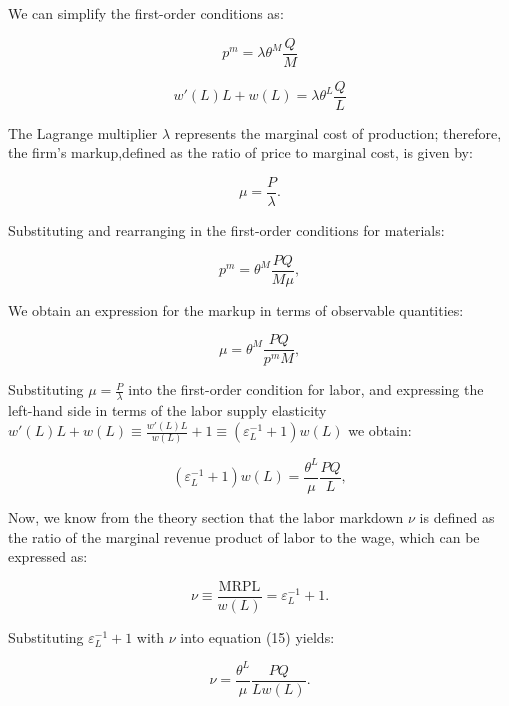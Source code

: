 \documentclass[12pt]{article}
\begin{document}
We can simplify the first-order conditions as:

\begin{equation}
p^m = \lambda \theta^M \frac{Q}{M}
\end{equation}

\begin{equation}
w'(L)L + w(L) = \lambda \theta^L  \frac{Q}{L}
\end{equation}

The Lagrange multiplier $\lambda$ represents the marginal cost of production; therefore, the firm's markup,defined as the ratio of price to marginal cost, is given by:

\begin{equation}
    \mu = \frac{P}{\lambda}.
\end{equation}

Substituting and rearranging in the first-order conditions for materials:

\begin{equation}
p^m = \theta^M \frac{PQ}{M \mu},
\end{equation}

We obtain an expression for the markup in terms of observable quantities:

\begin{equation}
\mu = \theta^M \frac{PQ}{p^m M},
\end{equation}

Substituting $\mu = \frac{P}{\lambda}$ into the first-order condition for labor, and expressing the left-hand side in terms of the labor supply elasticity $w'(L)L + w(L) \equiv \frac{w'(L)L}{w(L)} + 1 \equiv (\varepsilon_{L}^{-1} + 1) w(L)$ we obtain:

\begin{equation}
(\varepsilon_{L}^{-1} + 1) w(L)= \frac{\theta^L}{\mu} \frac{PQ}{L},
\end{equation}

Now, we know from the theory section that the labor markdown $\nu$ is defined as the ratio of the marginal revenue product of labor to the wage, which can be expressed as:

\begin{equation}
    \nu \equiv \frac{\mathrm{MRPL}}{w(L)} = 
    \varepsilon_{L}^{-1} + 1.
\end{equation}

Substituting $\varepsilon_{L}^{-1} + 1$ with $\nu$ into equation (15) yields:

\begin{equation}
\nu = \frac{\theta^L}{\mu} \frac{PQ}{L w(L)}.
\end{equation}
\end{document}
